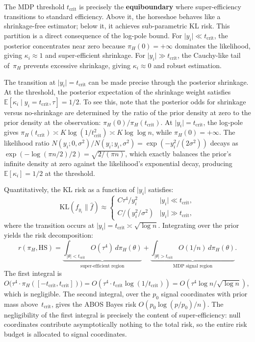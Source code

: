 \documentclass[12pt]{article}
\newcommand{\E}{\mathbb{E}}
\newcommand{\KL}{\mathrm{KL}}
\newcommand{\abs}[1]{\lvert #1 \rvert}
\newcommand{\piH}{\pi_H}
\newcommand{\tcrit}{t_{\mathrm{crit}}}
\begin{document}
The MDP threshold $\tcrit$ is precisely the \textbf{equiboundary} where super-efficiency transitions to standard efficiency. Above it, the horseshoe behaves like a shrinkage-free estimator; below it, it achieves sub-parametric KL risk. This partition is a direct consequence of the log-pole bound. For $\abs{y_i} \ll \tcrit$, the posterior concentrates near zero because $\piH(0) = +\infty$ dominates the likelihood, giving $\kappa_i \approx 1$ and super-efficient shrinkage. For $\abs{y_i} \gg \tcrit$, the Cauchy-like tail of~$\piH$ prevents excessive shrinkage, giving $\kappa_i \approx 0$ and robust estimation.

The transition at $\abs{y_i} = \tcrit$ can be made precise through the posterior shrinkage. At the threshold, the posterior expectation of the shrinkage weight satisfies $\E[\kappa_i \mid y_i = \tcrit, \tau] = 1/2$. To see this, note that the posterior odds for shrinkage versus no-shrinkage are determined by the ratio of the prior density at zero to the prior density at the observation: $\piH(0)/\piH(\tcrit)$. At $\abs{y_i} = \tcrit$, the log-pole gives $\piH(\tcrit) \asymp K\log(1/\tcrit^2) \asymp K\log\log n$, while $\piH(0) = +\infty$. The likelihood ratio $N(y_i; 0, \sigma^2)/N(y_i; y_i, \sigma^2) = \exp(-y_i^2/(2\sigma^2))$ decays as $\exp(-\log(\pi n/2)/2) = \sqrt{2/(\pi n)}$, which exactly balances the prior's infinite density at zero against the likelihood's exponential decay, producing $\E[\kappa_i] = 1/2$ at the threshold.

Quantitatively, the KL risk as a function of $\abs{y_i}$ satisfies:
\begin{equation}\label{eq:kl-partition}
  \KL(f_{y_i} \| \hat{f})
  \approx \begin{cases}
    C\tau^4/y_i^2 & \abs{y_i} \ll \tcrit, \\
    C/(y_i^2/\sigma^2) & \abs{y_i} \gg \tcrit,
  \end{cases}
\end{equation}
where the transition occurs at $\abs{y_i} = \tcrit \asymp \sqrt{\log n}$. Integrating over the prior yields the risk decomposition:
\begin{equation}\label{eq:risk-decomp}
  r(\piH, \mathrm{HS})
  = \underbrace{\int_{\abs{\theta} < \tcrit} O(\tau^4)\, d\piH(\theta)}_{\text{super-efficient region}}
  + \underbrace{\int_{\abs{\theta} > \tcrit} O(1/n)\, d\piH(\theta)}_{\text{MDP signal region}}.
\end{equation}
The first integral is $O\bigl(\tau^4 \cdot \piH([-\tcrit, \tcrit])\bigr) = O(\tau^4 \cdot \tcrit \log(1/\tcrit)) = O(\tau^4 \log n / \sqrt{\log n})$, which is negligible. The second integral, over the $p_0$ signal coordinates with prior mass above~$\tcrit$, gives the ABOS Bayes risk $O(p_0 \log(p/p_0)/n)$. The negligibility of the first integral is precisely the content of super-efficiency: null coordinates contribute asymptotically nothing to the total risk, so the entire risk budget is allocated to signal coordinates.
\end{document}
